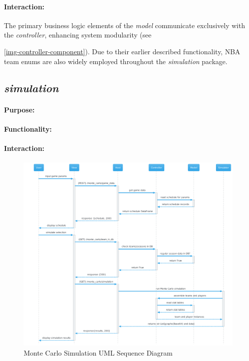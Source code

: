 \documentclass{thesis-ekf}
\theoremstyle{definition}
\theoremstyle{remark}
\begin{document}
\paragraph{Interaction:}
The primary business logic elements of the \emph{model} communicate exclusively with the \emph{controller}, enhancing system modularity (see {\ref{img-controller-component}). Due to their earlier described functionality, NBA team enums are also widely employed throughout the \emph{simulation} package. 

\subsection{\emph{simulation}}
\paragraph{Purpose:}


\paragraph{Functionality:}


\paragraph{Interaction:}

\begin{figure}[th!]
	\centering
	\includegraphics[width=1\linewidth]{img/sequence/monte_carlo/monte_carlo_sequence_cerulean}
	\caption{Monte Carlo Simulation UML Sequence Diagram}
	\label{img-monte-carlo-sequence}
\end{figure}

}
\end{document}
